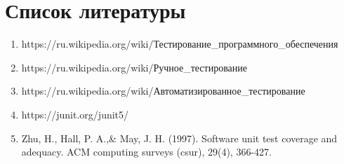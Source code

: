 \clearpage                                  %

\chapter*{Список литературы}          


\begin{enumerate}

\item https://ru.wikipedia.org/wiki/Тестирование_программного_обеспечения
	
\item https://ru.wikipedia.org/wiki/Ручное_тестирование

\item https://ru.wikipedia.org/wiki/Автоматизированное_тестирование

\item https://junit.org/junit5/

\item Zhu, H., Hall, P. A.,\& May, J. H. (1997). Software unit test coverage and adequacy. ACM computing surveys (csur), 29(4), 366-427.

\end{enumerate}


